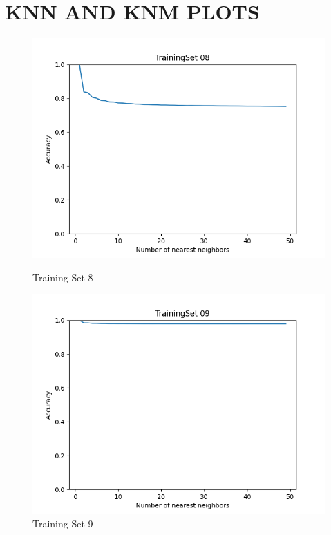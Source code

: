 \documentclass{article}
\begin{document}
\section{\MakeUppercase{KNN and KNM Plots}}
\begin{figure}[H]
	\centering
	\begin{minipage}{.33\textwidth}
			\centering
			\includegraphics[width=1\linewidth]{../KNN_TrainingSet 08.png}
			\caption{Training Set 8}
	\end{minipage}\hfill
        \centering
	\begin{minipage}{.33\textwidth}
			\centering
			\includegraphics[width=1\linewidth]{../KNN_TrainingSet 09.png}
			\caption{Training Set 9}
	\end{minipage}\hfill

\end{figure}
\end{document}
